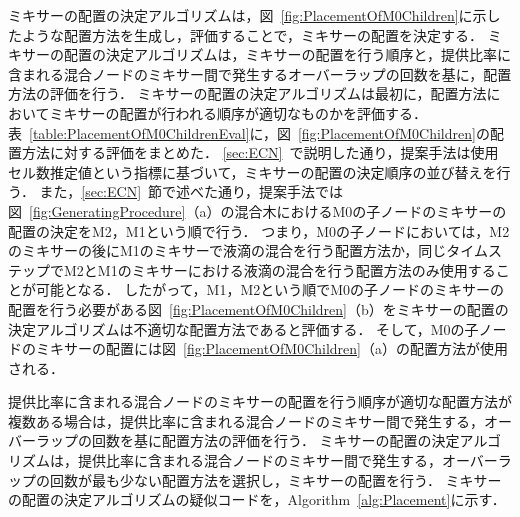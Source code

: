 ミキサーの配置の決定アルゴリズムは，図~\ref{fig:PlacementOfM0Children}に示したような配置方法を生成し，評価することで，ミキサーの配置を決定する．
ミキサーの配置の決定アルゴリズムは，ミキサーの配置を行う順序と，提供比率に含まれる混合ノードのミキサー間で発生するオーバーラップの回数を基に，配置方法の評価を行う．
ミキサーの配置の決定アルゴリズムは最初に，配置方法においてミキサーの配置が行われる順序が適切なものかを評価する．
表~\ref{table:PlacementOfM0ChildrenEval}に，図~\ref{fig:PlacementOfM0Children}の配置方法に対する評価をまとめた．
\ref{sec:ECN}~で説明した通り，提案手法は使用セル数推定値という指標に基づいて，ミキサーの配置の決定順序の並び替えを行う．
また，\ref{sec:ECN}~節で述べた通り，提案手法では図~\ref{fig:GeneratingProcedure}（a）の混合木におけるM0の子ノードのミキサーの配置の決定をM2，M1という順で行う．
つまり，M0の子ノードにおいては，M2のミキサーの後にM1のミキサーで液滴の混合を行う配置方法か，同じタイムステップでM2とM1のミキサーにおける液滴の混合を行う配置方法のみ使用することが可能となる．
したがって，M1，M2という順でM0の子ノードのミキサーの配置を行う必要がある図~\ref{fig:PlacementOfM0Children}（b）をミキサーの配置の決定アルゴリズムは不適切な配置方法であると評価する．
そして，M0の子ノードのミキサーの配置には図~\ref{fig:PlacementOfM0Children}（a）の配置方法が使用される．

提供比率に含まれる混合ノードのミキサーの配置を行う順序が適切な配置方法が複数ある場合は，提供比率に含まれる混合ノードのミキサー間で発生する，オーバーラップの回数を基に配置方法の評価を行う．
ミキサーの配置の決定アルゴリズムは，提供比率に含まれる混合ノードのミキサー間で発生する，オーバーラップの回数が最も少ない配置方法を選択し，ミキサーの配置を行う．
ミキサーの配置の決定アルゴリズムの疑似コードを，Algorithm~\ref{alg:Placement}に示す．

